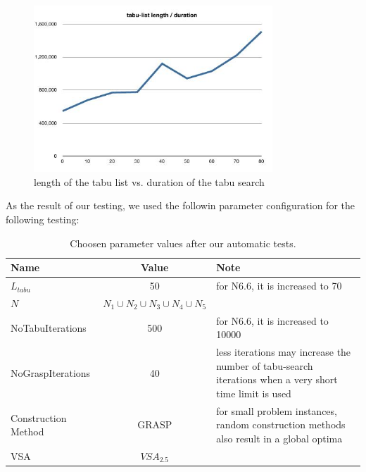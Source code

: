 \documentclass[a4paper,11pt]{article}
\begin{document}
\begin{figure}[htb]
  \begin{center}
    \includegraphics[width=0.8\textwidth]{images/tabulist-len-duration}
  \end{center}
  \caption{length of the tabu list vs. duration of the tabu search}
  \label{fig:tabu_len_cost}
\end{figure}

As the result of our testing, we used the followin parameter configuration for the following testing:

\begin{center}
  \begin{table}[htb]
    \begin{tabularx}{\linewidth}{| l | c | X | }
      \hline                       
      Name & Value & Note \\   \hline     \hline    
      $L_{tabu}$ & 50 & for N6.6, it is increased to 70 \\ \hline    
      $N$ &  $N_1 \cup N_2 \cup N_3 \cup N_4 \cup N_5 $ &  \\ \hline   
      NoTabuIterations & 500  &for N6.6, it is increased to 10000 \\ \hline  
      NoGraspIterations &  40 & less iterations may increase the number of tabu-search iterations when a very short time limit is used \\ \hline 
      Construction Method & GRASP  & for small problem instances, random construction methods also result in a global optima \\ \hline 
      VSA & $VSA_{2.5}$  & \\ \hline 
    \end{tabularx}
    \caption{Choosen parameter values after our automatic tests.}
  \end{table}
\end{center}
\end{document}
